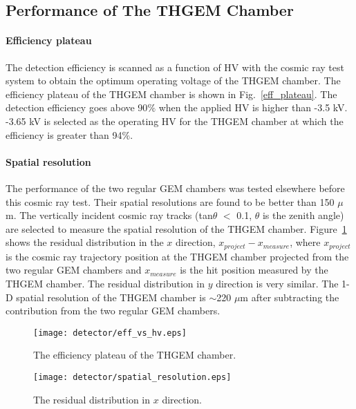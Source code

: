 \subsection{Performance of The THGEM Chamber}
\paragraph{Efficiency plateau} 
The detection efficiency is scanned as a function of HV with the cosmic ray test system to obtain the optimum operating voltage of the THGEM chamber. The efficiency plateau of the THGEM chamber is shown in Fig.~\ref{eff_plateau}. The detection efficiency goes above 90$\%$ when the applied HV is higher than -3.5 kV. -3.65 kV is selected as the operating HV for the THGEM chamber at which the efficiency is greater than 94$\%$.

\paragraph{Spatial resolution} 
The performance of the two regular GEM chambers was tested elsewhere before this cosmic ray test. Their spatial resolutions are found to be better than 150 $\mu$m. The vertically incident cosmic ray tracks (tan$\theta$ $<$ 0.1, $\theta$ is the zenith angle) are selected to measure the spatial resolution of the THGEM chamber. Figure~\ref{thgem_spatial} shows the residual distribution in the $x$ direction, $x_{project}-x_{measure}$, where $x_{project}$ is the cosmic ray trajectory position at the THGEM chamber projected from the two regular GEM chambers and $x_{measure}$ is the hit position measured by the THGEM chamber. The residual distribution in $y$ direction is very similar. The 1-D spatial resolution of the THGEM chamber is $\sim$220 $\mu$m after subtracting the contribution from the two regular GEM chambers. 
\begin{figure}[htbp]
\begin{minipage}[htbp]{0.48\linewidth}
\centering
\texttt{[image: detector/eff\_vs\_hv.eps]}
\caption{The efficiency plateau of the THGEM chamber. \label{eff_plateau}}
\end{minipage}
\hfill
\begin{minipage}[htbp]{0.5\linewidth}
\centering
\texttt{[image: detector/spatial\_resolution.eps]} 
\caption{The residual distribution in $x$ direction.\label{thgem_spatial}}
\end{minipage}
\end{figure}

